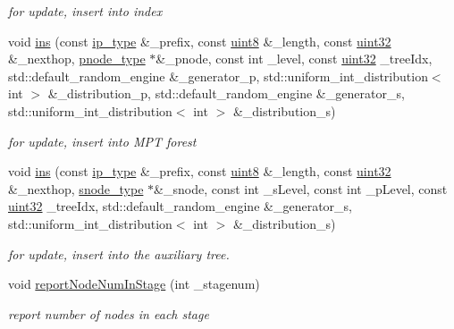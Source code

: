 \begin{DoxyCompactItemize}
\begin{DoxyCompactList}\small\item\em for update, insert into index \end{DoxyCompactList}\item 
void \hyperlink{classRMPTree_aa588b3479961066f6f9295f01e2b953e}{ins} (const \hyperlink{classRMPTree_a3dc76d54f334071d8a2bac2422db0159}{ip\-\_\-type} \&\-\_\-prefix, const \hyperlink{types_8h_a34ecedcf03a70dc91e4616212d79267d}{uint8} \&\-\_\-length, const \hyperlink{types_8h_abd01e8e67e3d94cab04ecaaf4f85ac1b}{uint32} \&\-\_\-nexthop, \hyperlink{classRMPTree_ac37da419a61106e5996632fc83670959}{pnode\-\_\-type} $\ast$\&\-\_\-pnode, const int \-\_\-level, const \hyperlink{types_8h_abd01e8e67e3d94cab04ecaaf4f85ac1b}{uint32} \-\_\-tree\-Idx, std\-::default\-\_\-random\-\_\-engine \&\-\_\-generator\-\_\-p, std\-::uniform\-\_\-int\-\_\-distribution$<$ int $>$ \&\-\_\-distribution\-\_\-p, std\-::default\-\_\-random\-\_\-engine \&\-\_\-generator\-\_\-s, std\-::uniform\-\_\-int\-\_\-distribution$<$ int $>$ \&\-\_\-distribution\-\_\-s)
\begin{DoxyCompactList}\small\item\em for update, insert into M\-P\-T forest \end{DoxyCompactList}\item 
void \hyperlink{classRMPTree_a78e29ac6b9235a7a82fe7461ce752bc2}{ins} (const \hyperlink{classRMPTree_a3dc76d54f334071d8a2bac2422db0159}{ip\-\_\-type} \&\-\_\-prefix, const \hyperlink{types_8h_a34ecedcf03a70dc91e4616212d79267d}{uint8} \&\-\_\-length, const \hyperlink{types_8h_abd01e8e67e3d94cab04ecaaf4f85ac1b}{uint32} \&\-\_\-nexthop, \hyperlink{classRMPTree_ade23f0b765f589613fe10d6cbab738e2}{snode\-\_\-type} $\ast$\&\-\_\-snode, const int \-\_\-s\-Level, const int \-\_\-p\-Level, const \hyperlink{types_8h_abd01e8e67e3d94cab04ecaaf4f85ac1b}{uint32} \-\_\-tree\-Idx, std\-::default\-\_\-random\-\_\-engine \&\-\_\-generator\-\_\-s, std\-::uniform\-\_\-int\-\_\-distribution$<$ int $>$ \&\-\_\-distribution\-\_\-s)
\begin{DoxyCompactList}\small\item\em for update, insert into the auxiliary tree. \end{DoxyCompactList}\item 
void \hyperlink{classRMPTree_aab37d3f74dc84185d2cc7aedb417f578}{report\-Node\-Num\-In\-Stage} (int \-\_\-stagenum)
\begin{DoxyCompactList}\small\item\em report number of nodes in each stage \end{DoxyCompactList}\end{DoxyCompactItemize}
